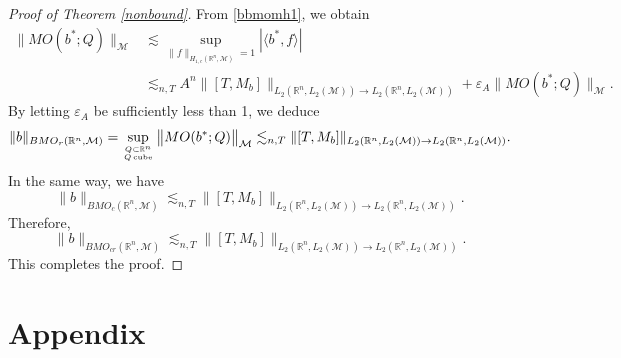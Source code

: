 \documentclass[oneside,english,a4wide]{amsart}
\numberwithin{equation}{section}
\numberwithin{figure}{section}
\theoremstyle{plain}
\theoremstyle{plain}
\theoremstyle{definition}
\theoremstyle{plain}
\theoremstyle{remark}
\theoremstyle{definition}
\theoremstyle{remark}
\theoremstyle{definition}
\newcommand{\8}{\infty}
\begin{document}
\begin{proof}[Proof of Theorem \ref{nonbound}]
	From \eqref{bbmomh1}, we obtain
	\begin{equation*}
		\begin{aligned}
			\big\|MO(b^*;Q)\big\|_{\mathcal{M}}{}&\lesssim \sup_{\|f\|_{H_{1,c}(\mathbb{R}^n,\mathcal{M})}=1}|\langle b^*,f\rangle|\\
		    &\lesssim_{n,T} A^n\|[T,M_{b}]\|_{L_2(\mathbb{R}^n,L_2(\mathcal{M}))\to L_2(\mathbb{R}^n,L_2(\mathcal{M}))}+\varepsilon_{A}\big\|MO(b^*;Q)\big\|_{\mathcal{M}}.
		\end{aligned}
	\end{equation*}
   By letting $\varepsilon_{A}$ be sufficiently less than 1, we deduce
     \begin{equation*}
     	\begin{aligned}
     	    \|b\|_{BMO_r(\mathbb{R}^n,\mathcal{M})}=\sup_{Q\subset \mathbb{R}^n \atop Q \operatorname{cube}}\big\|MO(b^*;Q)\big\|_{\mathcal{M}}\lesssim_{n,T} \|[T,M_{b}]\|_{L_2(\mathbb{R}^n,L_2(\mathcal{M}))\to L_2(\mathbb{R}^n,L_2(\mathcal{M}))}.	
     	\end{aligned}
     	\end{equation*}
In the same way, we have
	\begin{equation*}
		\|b\|_{BMO_c(\mathbb{R}^n,\mathcal{M})}\lesssim_{n,T} \|[T,M_{b}]\|_{L_2(\mathbb{R}^n,L_2(\mathcal{M}))\to L_2(\mathbb{R}^n,L_2(\mathcal{M}))}.
	\end{equation*}
	Therefore,
	\begin{equation*}
		\|b\|_{BMO_{cr}(\mathbb{R}^n,\mathcal{M})}\lesssim_{n,T} \|[T,M_{b}]\|_{L_2(\mathbb{R}^n,L_2(\mathcal{M}))\to L_2(\mathbb{R}^n,L_2(\mathcal{M}))}.
	\end{equation*}	
	This completes the proof.
\end{proof}

\bigskip




\section{Appendix}\label{appendix}
\end{document}
